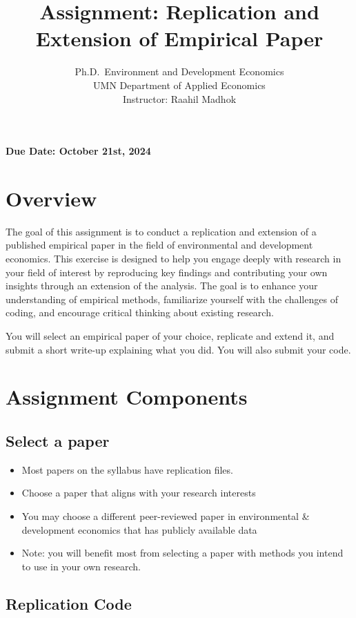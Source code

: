 \documentclass[
]{article}
\title{Assignment: Replication and Extension of Empirical Paper}
\subtitle{Ph.D.~Environment and Development Economics\\
UMN Department of Applied Economics\\
Instructor: Raahil Madhok}
\author{}
\date{\vspace{-2.5em}}
\providecommand{\tightlist}{%
  \setlength{\itemsep}{0pt}\setlength{\parskip}{0pt}}
\begin{document}
\maketitle

\textbf{Due Date: October 21st, 2024}

\hypertarget{overview}{%
\section{Overview}\label{overview}}

The goal of this assignment is to conduct a replication and extension of a published empirical paper in the field of environmental and development economics. This exercise is designed to help you engage deeply with research in your field of interest by reproducing key findings and contributing your own insights through an extension of the analysis. The goal is to enhance your understanding of empirical methods, familiarize yourself with the challenges of coding, and encourage critical thinking about existing research.

You will select an empirical paper of your choice, replicate and extend it, and submit a short write-up explaining what you did. You will also submit your code.

\hypertarget{assignment-components}{%
\section{Assignment Components}\label{assignment-components}}

\hypertarget{select-a-paper}{%
\subsection{Select a paper}\label{select-a-paper}}

\begin{itemize}
\tightlist
\item
  Most papers on the syllabus have replication files.
\item
  Choose a paper that aligns with your research interests
\item
  You may choose a different peer-reviewed paper in environmental \& development economics that has publicly available data
\item
  Note: you will benefit most from selecting a paper with methods you intend to use in your own research.
\end{itemize}

\hypertarget{replication-code}{%
\subsection{Replication Code}\label{replication-code}}
\end{document}
